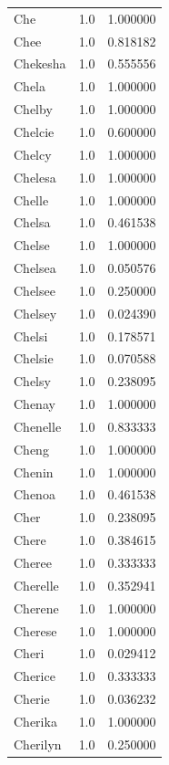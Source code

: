 \documentclass[
  letterpaper,
  DIV=11,
  numbers=noendperiod]{scrreprt}
\begin{document}
\begin{tabular}{lrr}
Che             &   1.0 &   1.000000 \\
Chee            &   1.0 &   0.818182 \\
Chekesha        &   1.0 &   0.555556 \\
Chela           &   1.0 &   1.000000 \\
Chelby          &   1.0 &   1.000000 \\
Chelcie         &   1.0 &   0.600000 \\
Chelcy          &   1.0 &   1.000000 \\
Chelesa         &   1.0 &   1.000000 \\
Chelle          &   1.0 &   1.000000 \\
Chelsa          &   1.0 &   0.461538 \\
Chelse          &   1.0 &   1.000000 \\
Chelsea         &   1.0 &   0.050576 \\
Chelsee         &   1.0 &   0.250000 \\
Chelsey         &   1.0 &   0.024390 \\
Chelsi          &   1.0 &   0.178571 \\
Chelsie         &   1.0 &   0.070588 \\
Chelsy          &   1.0 &   0.238095 \\
Chenay          &   1.0 &   1.000000 \\
Chenelle        &   1.0 &   0.833333 \\
Cheng           &   1.0 &   1.000000 \\
Chenin          &   1.0 &   1.000000 \\
Chenoa          &   1.0 &   0.461538 \\
Cher            &   1.0 &   0.238095 \\
Chere           &   1.0 &   0.384615 \\
Cheree          &   1.0 &   0.333333 \\
Cherelle        &   1.0 &   0.352941 \\
Cherene         &   1.0 &   1.000000 \\
Cherese         &   1.0 &   1.000000 \\
Cheri           &   1.0 &   0.029412 \\
Cherice         &   1.0 &   0.333333 \\
Cherie          &   1.0 &   0.036232 \\
Cherika         &   1.0 &   1.000000 \\
Cherilyn        &   1.0 &   0.250000 \\

\end{tabular}
\end{document}
